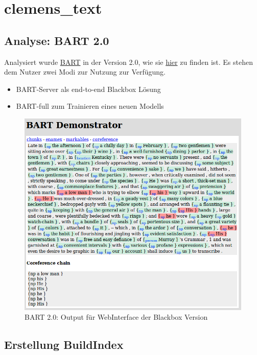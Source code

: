 \section{clemens\_text}\label{clemens_text} %
 
\subsection{Analyse: BART 2.0}

Analysiert wurde \href{http://www.bart-anaphora.org/}{BART} in der Version 2.0, 
wie sie \href{http://www.bart-anaphora.org/release/bart-2.0.tar.gz}{hier} zu finden ist.
Es stehen dem Nutzer zwei Modi zur Nutzung zur Verfügung.
\begin{itemize}
\item BART-Server als end-to-end Blackbox Lösung
\item BART-full zum Trainieren eines neuen Modells
\end{itemize}

\begin{figure}[ht]
\begin{center}
\includegraphics[width=12cm]{./img/cle/bart_webUI_output.png}
\caption{BART 2.0: Output für WebInterface der Blackbox Version}
\label{bart_webUI_output}
\end{center}
\end{figure}



% 



 \subsection{Erstellung BuildIndex} %